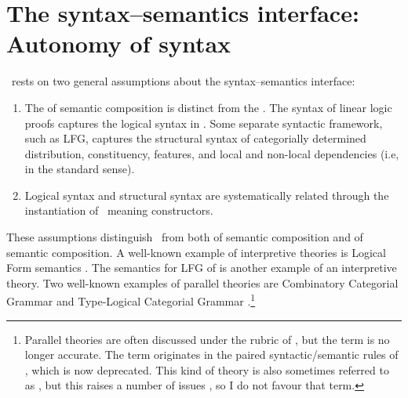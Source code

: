 \documentclass[output=paper,hidelinks]{langscibook}
\begin{document}
\largerpage[-1]
\section{The syntax--semantics interface: Autonomy of syntax}
\label{sec:glue-interface}


\glue\ rests on two general  assumptions about the syntax--semantics
interface:
%
\begin{enumerate}
\item\label{item:2} \label{item:1} The  of semantic composition
  \citep{fenstad;ea87} is distinct from the . The syntax of linear logic proofs captures the logical
  syntax in \glue. Some separate syntactic framework, such as LFG,
  captures the structural syntax of categorially determined
  distribution, constituency, features, and local and non-local
  dependencies (i.e,  in the standard sense).
\item\label{item:3} Logical syntax and structural syntax are systematically related 
  through the instantiation of \glue\ meaning constructors. 
\end{enumerate}
%
These assumptions distinguish \glue\ from both  of semantic composition and  of
semantic composition. A well-known example of interpretive theories is
Logical Form semantics \citep[e.g.,][]{heim1998semantics}. The 
semantics for LFG of \citet{halvorsen83} is another example of an
interpretive theory. Two well-known examples of parallel theories are
Combinatory Categorial Grammar \citep[e.g.,][]{steedman;baldridge11}
and Type-Logical Categorial Grammar
\citep[e.g.,][]{carpenter97}.\footnote{Parallel theories are often
  discussed under the rubric of 
  \citep{bach:extension}, but the  
  term is no longer accurate. The term originates in the paired
  syntactic/semantic rules of \citet{montague73}, which is now
  deprecated. This kind of theory is also sometimes
  referred to as 
  \citep{barker;jacobson07,jacobson14}, but this raises a number of
  issues \citep{asudeh2006direct}, so I do not favour that term.}
\end{document}
